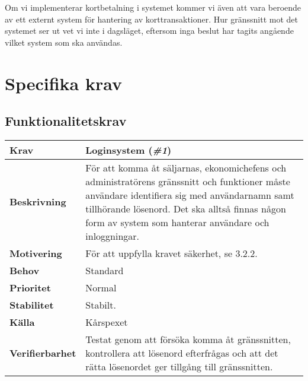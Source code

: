 \documentclass[a4paper, twoside, 11pt, titlepage]{article}
\begin{document}
	Om vi implementerar kortbetalning i systemet kommer vi även att vara beroende av ett externt system för hantering av korttransaktioner. Hur gränssnitt mot det systemet ser ut vet vi inte i dagsläget, eftersom inga beslut har tagits angående vilket system som ska användas.

\clearpage
\section{Specifika krav}



	\subsection{Funktionalitetskrav}


	\begin{tabular} { p{2.6cm} p{12.5cm} }
		\hline
		\sffamily\textbf{Krav} & Loginsystem (\emph{\#1})  \\
		\hline
		\sffamily\textbf{Beskrivning} & För att komma åt säljarnas, ekonomichefens och administratörens gränssnitt och funktioner måste användare identifiera sig med användarnamn samt tillhörande lösenord. Det ska alltså finnas någon form av system som hanterar användare och inloggningar.  \\
		\hline
		\sffamily\textbf{Motivering} & För att uppfylla kravet säkerhet, se 3.2.2.  \\
		\hline
		\sffamily\textbf{Behov} & Standard  \\
		\hline
		\sffamily\textbf{Prioritet} & Normal  \\
		\hline
		\sffamily\textbf{Stabilitet} & Stabilt.  \\
		\hline
		\sffamily\textbf{Källa} & Kårspexet  \\
		\hline
		\sffamily\textbf{Verifierbarhet} & Testat genom att försöka komma åt gränssnitten, kontrollera att lösenord efterfrågas och att det rätta lösenordet ger tillgång till gränssnitten.  \\
		\hline
	\end{tabular}
	\vspace{6mm}
\end{document}
